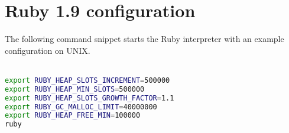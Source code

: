 \chapter{Ruby 1.9 configuration} %
\label{ap:ruby19_configuration}

The following command snippet starts the Ruby interpreter with an example configuration on UNIX.\\\\

\begin{lstlisting}[language=bash]
export RUBY_HEAP_SLOTS_INCREMENT=500000
export RUBY_HEAP_MIN_SLOTS=500000
export RUBY_HEAP_SLOTS_GROWTH_FACTOR=1.1
export RUBY_GC_MALLOC_LIMIT=40000000
export RUBY_HEAP_FREE_MIN=100000
ruby
\end{lstlisting}
